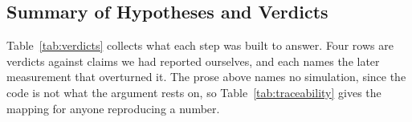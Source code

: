 %
%
%
%

\subsection{Summary of Hypotheses and Verdicts}
\label{subsec:exphist:verdicts}
Table~\ref{tab:verdicts} collects what each step was built to answer.
Four rows are verdicts against claims we had reported ourselves, and each names the later measurement
that overturned it.
The prose above names no simulation, since the code is not what the argument rests on, so
Table~\ref{tab:traceability} gives the mapping for anyone reproducing a number.

